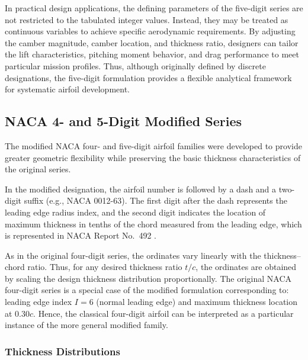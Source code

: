In practical design applications, the defining parameters of the 
five-digit series are not restricted to the tabulated integer values. 
Instead, 
they may be treated as continuous variables to achieve 
specific aerodynamic requirements. 
By adjusting the camber magnitude, camber location, and thickness 
ratio, designers can tailor the lift characteristics, pitching 
moment behavior, and drag performance to meet particular mission 
profiles.
Thus, 
although originally defined by discrete designations, 
the five-digit formulation provides a flexible analytical framework 
for systematic airfoil development.


\subsection*{NACA 4- and 5-Digit Modified Series}

The modified NACA four- and five-digit airfoil families were developed 
to provide greater geometric flexibility 
while preserving the basic thickness characteristics of the original series. 

In the modified designation, 
the airfoil number is followed by a dash and a two-digit suffix (e.g., NACA 0012-63). 
The first digit after the dash represents the leading edge radius index, and the second digit 
indicates the location of maximum thickness in tenths of the chord 
measured from the leading edge, which is represented in NACA Report No.~492 \cite{NACA_TR_492}.

As in the original four-digit series, the ordinates vary linearly 
with the thickness–chord ratio. 
Thus, for any desired thickness ratio $t/c$, the ordinates 
are obtained by scaling the design thickness distribution 
proportionally.
The original NACA four-digit series is a special case of the modified 
formulation corresponding to: leading edge index $I = 6$ (normal leading edge) and maximum thickness location at $0.30c$.
Hence, the classical four-digit airfoil can be interpreted as 
a particular instance of the more general modified family.


\subsubsection*{Thickness Distributions}

